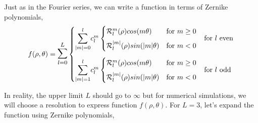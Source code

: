 Just as in the Fourier series, we can write a function in terms of Zernike polynomials,
\begin{equation}
    f(\rho,\theta) = \mathlarger{\mathlarger{\sum}}_{l=0}^{L}\begin{cases}
        \mathlarger{\sum}_{|m|=0}^{l} c_l^m \begin{cases}
            \mathcal{R}_l^{m}(\rho) cos(m\theta) & \text{for } m\geq0 \\[.2cm]
            \mathcal{R}_l^{|m|}(\rho) sin(|m|\theta) & \text{for } m<0
        \end{cases}& \text{for } l \text{ even} \\[.7cm]
        \mathlarger{\sum}_{|m|=1}^{l} c_l^m \begin{cases}
            \mathcal{R}_l^{m}(\rho) cos(m\theta) & \text{for } m\geq0   \\[.2cm]
            \mathcal{R}_l^{|m|}(\rho) sin(|m|\theta) & \text{for } m<0
        \end{cases}& \text{for } l \text{ odd}
        \end{cases}
\end{equation}

In reality, the upper limit $L$ should go to $\infty$ but for numerical simulations, we will choose a resolution to express function $f(\rho,\theta)$. For $L=3$, let's expand the function using Zernike polynomials,

